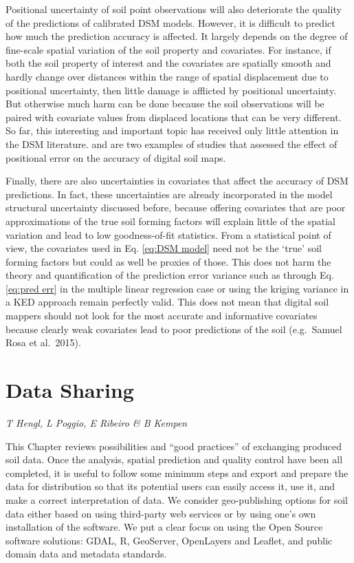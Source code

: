 \documentclass[10pt,b5paper,]{book}
\theoremstyle{definition}
\theoremstyle{definition}
\theoremstyle{definition}
\theoremstyle{remark}
\begin{document}
Positional uncertainty of soil point observations will also deteriorate
the quality of the predictions of calibrated DSM models. However, it is
difficult to predict how much the prediction accuracy is affected. It
largely depends on the degree of fine-scale spatial variation of the
soil property and covariates. For instance, if both the soil property of
interest and the covariates are spatially smooth and hardly change over
distances within the range of spatial displacement due to positional
uncertainty, then little damage is afflicted by positional uncertainty.
But otherwise much harm can be done because the soil observations will
be paired with covariate values from displaced locations that can be
very different. So far, this interesting and important topic has
received only little attention in the DSM literature.
\cite{grimm2010uncertainty} and \cite{nelson2011error} are two examples
of studies that assessed the effect of positional error on the accuracy
of digital soil maps.

Finally, there are also uncertainties in covariates that affect the
accuracy of DSM predictions. In fact, these uncertainties are already
incorporated in the model structural uncertainty discussed before,
because offering covariates that are poor approximations of the true
soil forming factors will explain little of the spatial variation and
lead to low goodness-of-fit statistics. From a statistical point of
view, the covariates used in Eq. \ref{eq:DSM model} need not be the
`true' soil forming factors but could as well be proxies of those. This
does not harm the theory and quantification of the prediction error
variance such as through Eq. \ref{eq:pred err} in the multiple linear
regression case or using the kriging variance in a KED approach remain
perfectly valid. This does not mean that digital soil mappers should not
look for the most accurate and informative covariates because clearly
weak covariates lead to poor predictions of the soil (e.g.~Samuel Rosa
et al.~2015).

\hypertarget{data-sharing}{%
\chapter{Data Sharing}\label{data-sharing}}

\emph{T Hengl, L Poggio, E Ribeiro \& B Kempen}

This Chapter reviews possibilities and ``good practices'' of exchanging
produced soil data. Once the analysis, spatial prediction and quality
control have been all completed, it is useful to follow some minimum
steps and export and prepare the data for distribution so that its
potential users can easily access it, use it, and make a correct
interpretation of data. We consider geo-publishing options for soil data
either based on using third-party web services or by using one's own
installation of the software. We put a clear focus on using the Open
Source software solutions: GDAL, R, GeoServer, OpenLayers and Leaflet,
and public domain data and metadata standards.
\end{document}

